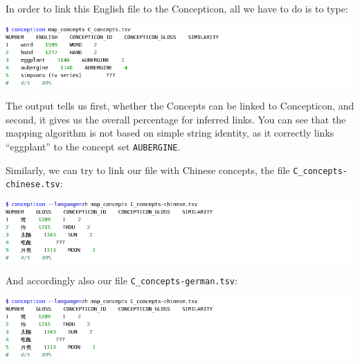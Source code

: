 \documentclass[a4paper,svgnames]{scrartcl}
\begin{document}
In order to link this English file to the Concepticon, all we have to do
is to type:
 
\includegraphics[width=\textwidth]{images/code-1.png}

The output tells us first, whether the Concepts can be linked to
Concepticon, and second, it gives us the overall percentage for inferred
links. You can see that the mapping algorithm is not based on simple
string identity, as it correctly links ``eggplant'' to the concept set
\texttt{AUBERGINE}.

Similarly, we can try to link our file with Chinese concepts, the file
\texttt{C\_concepts-chinese.tsv}:
 
\includegraphics[width=\textwidth]{images/code-2.png}


And accordingly also our file \texttt{C\_concepts-german.tsv}:

\includegraphics[width=\textwidth]{images/code-2.png}
\end{document}
